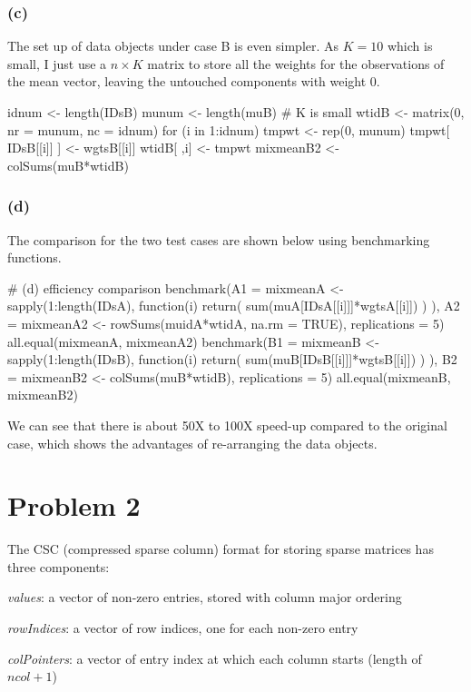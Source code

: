 \documentclass{article}
\begin{document}
\subsubsection*{(c)}
The set up of data objects under case B is even simpler. As $K=10$ which is small, I just use a $n \times K$ matrix to
store all the weights for the observations of the mean vector, leaving the untouched components with weight 0.

idnum <- length(IDsB)
munum <- length(muB) # K is small
wtidB <- matrix(0, nr = munum, nc = idnum)
for (i in 1:idnum) {
	tmpwt <- rep(0, munum)
	tmpwt[ IDsB[[i]] ] <- wgtsB[[i]]
	wtidB[ ,i] <- tmpwt
}
mixmeanB2 <- colSums(muB*wtidB)

\subsubsection*{(d)}
The comparison for the two test cases are shown below using benchmarking functions.

# (d) efficiency comparison
benchmark(A1 = {mixmeanA <- sapply(1:length(IDsA), 
                            function(i){ return( sum(muA[IDsA[[i]]]*wgtsA[[i]]) ) })},
          A2 = {mixmeanA2 <- rowSums(muidA*wtidA, na.rm = TRUE)}, 
          replications = 5)
all.equal(mixmeanA, mixmeanA2)
benchmark(B1 = {mixmeanB <- sapply(1:length(IDsB), 
                            function(i){ return( sum(muB[IDsB[[i]]]*wgtsB[[i]]) ) })},
          B2 = {mixmeanB2 <- colSums(muB*wtidB)}, 
          replications = 5)
all.equal(mixmeanB, mixmeanB2)

We can see that there is about 50X to 100X speed-up compared to the original case, which shows the 
advantages of re-arranging the data objects.

\newpage
\section*{Problem 2}
The CSC (compressed sparse column) format for storing sparse matrices has three components:
\small
\begin{description}
\item \textit{values}: a vector of non-zero entries, stored with column major ordering
\item \textit{rowIndices}: a vector of row indices, one for each non-zero entry
\item \textit{colPointers}: a vector of entry index at which each column starts (length of $ncol + 1$)
\end{description}
\normalsize
\end{document}
